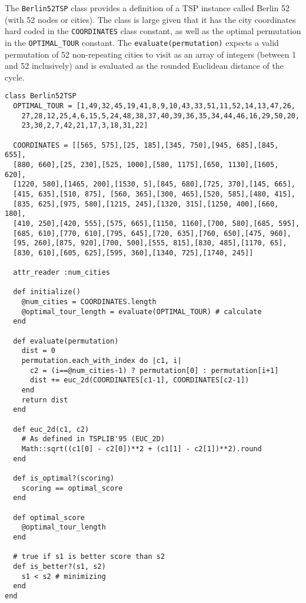 The \texttt{Berlin52TSP} class provides a definition of a TSP instance called Berlin 52 (with 52 nodes or cities). The class is large given that it has the city coordinates hard coded in the \texttt{COORDINATES} class constant, as well as the optimal permutation in the \texttt{OPTIMAL\_TOUR} constant. The \texttt{evaluate(permutation)} expects a valid permutation of 52 non-repeating cities to visit as an array of integers (between 1 and 52 inclusively) and is evaluated as the rounded Euclidean distance of the cycle.

\begin{lstlisting}
class Berlin52TSP
  OPTIMAL_TOUR = [1,49,32,45,19,41,8,9,10,43,33,51,11,52,14,13,47,26,
    27,28,12,25,4,6,15,5,24,48,38,37,40,39,36,35,34,44,46,16,29,50,20,
    23,30,2,7,42,21,17,3,18,31,22]
        
  COORDINATES = [[565, 575],[25, 185],[345, 750],[945, 685],[845, 655],
  [880, 660],[25, 230],[525, 1000],[580, 1175],[650, 1130],[1605, 620], 
  [1220, 580],[1465, 200],[1530, 5],[845, 680],[725, 370],[145, 665],
  [415, 635],[510, 875], [560, 365],[300, 465],[520, 585],[480, 415],
  [835, 625],[975, 580],[1215, 245],[1320, 315],[1250, 400],[660, 180],
  [410, 250],[420, 555],[575, 665],[1150, 1160],[700, 580],[685, 595],
  [685, 610],[770, 610],[795, 645],[720, 635],[760, 650],[475, 960],
  [95, 260],[875, 920],[700, 500],[555, 815],[830, 485],[1170, 65],
  [830, 610],[605, 625],[595, 360],[1340, 725],[1740, 245]]
  
  attr_reader :num_cities

  def initialize()
    @num_cities = COORDINATES.length        
    @optimal_tour_length = evaluate(OPTIMAL_TOUR) # calculate
  end
  
  def evaluate(permutation)
    dist = 0    
    permutation.each_with_index do |c1, i|
      c2 = (i==@num_cities-1) ? permutation[0] : permutation[i+1] 
      dist += euc_2d(COORDINATES[c1-1], COORDINATES[c2-1])
    end
    return dist
  end
  
  def euc_2d(c1, c2)
    # As defined in TSPLIB'95 (EUC_2D)
    Math::sqrt((c1[0] - c2[0])**2 + (c1[1] - c2[1])**2).round
  end

  def is_optimal?(scoring)
    scoring == optimal_score
  end

  def optimal_score
    @optimal_tour_length
  end
  
  # true if s1 is better score than s2
  def is_better?(s1, s2)
    s1 < s2 # minimizing
  end
end
\end{lstlisting}

